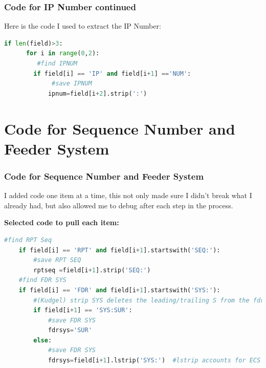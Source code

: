 \documentclass{beamer}\usepackage[]{graphicx}\usepackage[]{color}
\begin{document}
\begin{frame}[fragile]
  \frametitle{Code for IP Number continued}
Here is the code I used to extract the IP Number:

\begin{lstlisting}[language=Python]
if len(field)>3:
      for i in range(0,2):
         #find IPNUM
        if field[i] == 'IP' and field[i+1] =='NUM':
             #save IPNUM
            ipnum=field[i+2].strip(':')

\end{lstlisting}
  
   
\end{frame}

\section{Code for Sequence Number and Feeder System}
\begin{frame}[fragile]
  \frametitle{Code for Sequence Number and Feeder System}
I added code one item at a time, this not only made sure I didn't break what I already had, but also allowed me to debug after each step in the process.

\textbf{Selected code to pull each item:}

\begin{lstlisting}[language=Python]
    #find RPT Seq
    if field[i] == 'RPT' and field[i+1].startswith('SEQ:'):
        #save RPT SEQ
        rptseq =field[i+1].strip('SEQ:')
    #find FDR SYS
    if field[i] == 'FDR' and field[i+1].startswith('SYS:'):
        #(Kudgel) strip SYS deletes the leading/trailing S from the fdrsys
        if field[i+1] == 'SYS:SUR':
            #save FDR SYS
            fdrsys='SUR'
        else:
            #save FDR SYS
            fdrsys=field[i+1].lstrip('SYS:')  #lstrip accounts for ECS fdr system
\end{lstlisting}
   
\end{frame}
\end{document}
